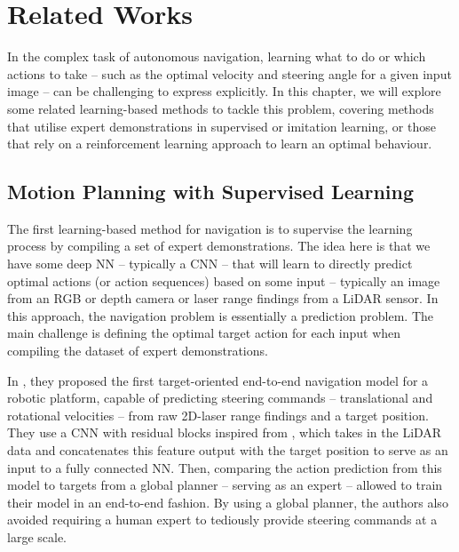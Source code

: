 \chapter{Related Works}
\label{chap:3_related_works}
\begin{comment}
There is extensive prior work in learning-based methods for autonomous navigation. Together, they encompass a variety of methods, from model-based to model-free, applied in environments including land, air, cluttered and dynamic. 
Despite these differences, the challenge of learning-based autonomous navigation is usually approached through the same three questions:
\begin{enumerate}
    \item How can the environment be perceived? 
    \item What actions can be taken? 
    \item How can these be learned?
\end{enumerate}
\end{comment}

In the complex task of autonomous navigation, learning what to do or which actions to take -- such as the optimal velocity and steering angle for a given input image -- can be challenging to express explicitly. In this chapter, we will explore some related learning-based methods to tackle this problem, covering methods that utilise expert demonstrations in supervised or imitation
learning, or those that rely on a reinforcement learning approach to learn an optimal behaviour.

\section{Motion Planning with Supervised Learning}
\label{sec:3_supervised_learning}
The first learning-based method for navigation is to supervise the learning process by compiling a set of expert demonstrations. The idea here is that we have some deep NN -- typically a CNN -- that will learn to directly predict optimal actions (or action sequences) based on some input -- typically an image from an RGB or depth camera or laser range findings from a LiDAR sensor. In this approach, the navigation problem is essentially a prediction problem. The main challenge is defining the optimal target action for each input when compiling the dataset of expert demonstrations.

In \cite{pfeiffer2017perception}, they proposed the first target-oriented end-to-end navigation model for a robotic platform, capable of predicting steering commands -- translational and rotational velocities -- from raw 2D-laser range findings and a target position. They use a CNN with residual blocks inspired from \cite{KaimingResNet}, which takes in the LiDAR data and concatenates this feature output with the target position to serve as an input to a fully connected NN. Then, comparing the action prediction from this model to targets from a global planner -- serving as an expert -- allowed \cite{pfeiffer2017perception}  to train their model in an end-to-end fashion. By using a global planner, the authors also avoided requiring a human expert to tediously provide steering commands at a large scale.

